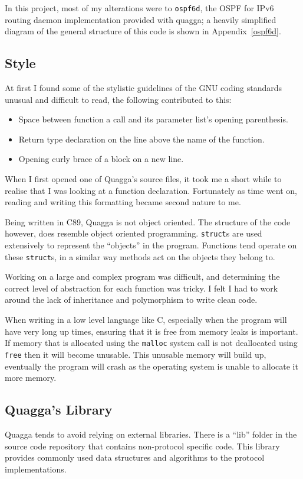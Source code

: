 \documentclass[12pt,a4paper,twoside]{report}
\begin{document}
In this project, most of my alterations were to \texttt{ospf6d}, the OSPF for
IPv6 routing daemon implementation provided with quagga; a heavily simplified
diagram of the general structure of this code is shown in
Appendix~\ref{ospf6d}.

\subsection{Style}
At first I found some of the stylistic guidelines of the GNU coding standards
unusual and difficult to read, the following contributed to this:
\begin{itemize} 
  \item Space between function a call and its parameter list's opening parenthesis.
  \item Return type declaration on the line above the name of the function.  
  \item Opening curly brace of a block on a new line.
\end{itemize}

When I first opened one of Quagga's source files, it took me a short while to
realise that I was looking at a function declaration. Fortunately as time went
on, reading and writing this formatting became second nature to me. 

Being written in C89, Quagga is not object oriented. The structure of the code
however, does resemble object oriented programming. \texttt{struct}s are used
extensively to represent the ``objects'' in the program. Functions tend operate
on these \texttt{struct}s, in a similar way methods act on the objects
they belong to.

Working on a large and complex program was difficult, and determining the
correct level of abstraction for each function was tricky.  I felt I had to
work around the lack of inheritance and polymorphism to write clean code. 

When writing in a low level language like C, especially when the program will
have very long up times, ensuring that it is free from memory leaks is
important. If memory that is allocated using the \texttt{malloc} system call is
not deallocated using \texttt{free} then it will become unusable. This unusable
memory will build up, eventually the program will crash as the operating system
is unable to allocate it more memory.

\subsection{Quagga's Library}
Quagga tends to avoid relying on external libraries. There is a ``lib'' folder
in the source code repository that contains non-protocol specific code. This
library provides commonly used data structures and algorithms to the protocol
implementations. 
\end{document}
